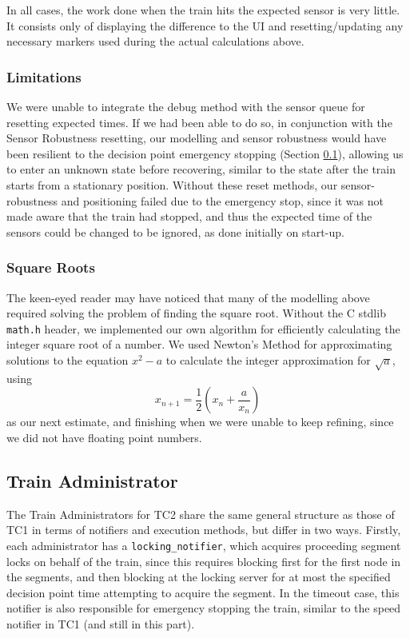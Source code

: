 \documentclass[12pt, titlepage]{article}
\begin{document}
    In all cases, the work done when the train hits the expected sensor is very little. It consists only of displaying the difference to the UI and resetting/updating any necessary markers used during the actual calculations above.
    
    \subsubsection{Limitations}
    
    We were unable to integrate the debug method with the sensor queue for resetting expected times. If we had been able to do so, in conjunction with the Sensor Robustness resetting, our modelling and sensor robustness would have been resilient to the decision point emergency stopping (Section \ref{sec:train}), allowing us to enter an unknown state before recovering, similar to the state after the train starts from a stationary position. Without these reset methods, our sensor-robustness and positioning failed due to the emergency stop, since it was not made aware that the train had stopped, and thus the expected time of the sensors could be changed to be ignored, as done initially on start-up.
    
    \subsubsection{Square Roots}
    
    The keen-eyed reader may have noticed that many of the modelling above required solving the problem of finding the square root. Without the C stdlib \verb`math.h` header, we implemented our own algorithm for efficiently calculating the integer square root of a number. We used Newton's Method for approximating solutions to the equation $x^2 - a$ to calculate the integer approximation for $\sqrt a$, using
    \[
        x_{n+1} = \frac{1}{2}\left(x_n + \frac{a}{x_n}\right)
    \]
    as our next estimate, and finishing when we were unable to keep refining, since we did not have floating point numbers.
    
    \subsection{Train Administrator}
    \label{sec:train}
    
    The Train Administrators for TC2 share the same general structure as those of TC1 in terms of notifiers and execution methods, but differ in two ways. Firstly, each administrator has a \verb`locking_notifier`, which acquires proceeding segment locks on behalf of the train, since this requires blocking first for the first node in the segments, and then blocking at the locking server for at most the specified decision point time attempting to acquire the segment. In the timeout case, this notifier is also responsible for emergency stopping the train, similar to the speed notifier in TC1 (and still in this part).
    
\end{document}
